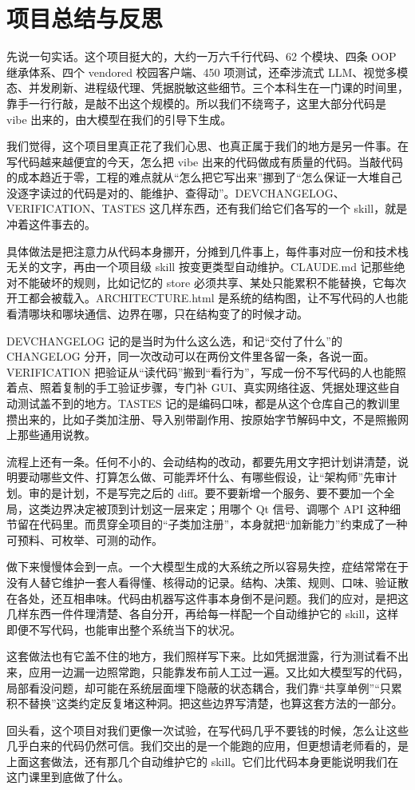 \documentclass[UTF8,a4paper,11pt,fontset=none]{ctexart}
\begin{document}
\section{项目总结与反思}

先说一句实话。这个项目挺大的，大约一万六千行代码、62 个模块、四条 OOP 继承体系、四个 vendored 校园客户端、450 项测试，还牵涉流式 LLM、视觉多模态、并发刷新、进程级代理、凭据脱敏这些细节。三个本科生在一门课的时间里，靠手一行行敲，是敲不出这个规模的。所以我们不绕弯子，这里大部分代码是 vibe 出来的，由大模型在我们的引导下生成。

我们觉得，这个项目里真正花了我们心思、也真正属于我们的地方是另一件事。在写代码越来越便宜的今天，怎么把 vibe 出来的代码做成有质量的代码。当敲代码的成本趋近于零，工程的难点就从“怎么把它写出来”挪到了“怎么保证一大堆自己没逐字读过的代码是对的、能维护、查得动”。DEVCHANGELOG、VERIFICATION、TASTES 这几样东西，还有我们给它们各写的一个 skill，就是冲着这件事去的。

具体做法是把注意力从代码本身挪开，分摊到几件事上，每件事对应一份和技术栈无关的文字，再由一个项目级 skill 按变更类型自动维护。CLAUDE.md 记那些绝对不能破坏的规则，比如记忆的 store 必须共享、某处只能累积不能替换，它每次开工都会被载入。ARCHITECTURE.html 是系统的结构图，让不写代码的人也能看清哪块和哪块通信、边界在哪，只在结构变了的时候才动。

DEVCHANGELOG 记的是当时为什么这么选，和记“交付了什么”的 CHANGELOG 分开，同一次改动可以在两份文件里各留一条，各说一面。VERIFICATION 把验证从“读代码”搬到“看行为”，写成一份不写代码的人也能照着点、照着复制的手工验证步骤，专门补 GUI、真实网络往返、凭据处理这些自动测试盖不到的地方。TASTES 记的是编码口味，都是从这个仓库自己的教训里攒出来的，比如子类加注册、导入别带副作用、按原始字节解码中文，不是照搬网上那些通用说教。

流程上还有一条。任何不小的、会动结构的改动，都要先用文字把计划讲清楚，说明要动哪些文件、打算怎么做、可能弄坏什么、有哪些假设，让“架构师”先审计划。审的是计划，不是写完之后的 diff。要不要新增一个服务、要不要加一个全局，这类边界决定被顶到计划这一层来定；用哪个 Qt 信号、调哪个 API 这种细节留在代码里。而贯穿全项目的“子类加注册”，本身就把“加新能力”约束成了一种可预料、可枚举、可测的动作。

做下来慢慢体会到一点。一个大模型生成的大系统之所以容易失控，症结常常在于没有人替它维护一套人看得懂、核得动的记录。结构、决策、规则、口味、验证散在各处，还互相串味。代码由机器写这件事本身倒不是问题。我们的应对，是把这几样东西一件件理清楚、各自分开，再给每一样配一个自动维护它的 skill，这样即便不写代码，也能审出整个系统当下的状况。

这套做法也有它盖不住的地方，我们照样写下来。比如凭据泄露，行为测试看不出来，应用一边漏一边照常跑，只能靠发布前人工过一遍。又比如大模型写的代码，局部看没问题，却可能在系统层面埋下隐蔽的状态耦合，我们靠“共享单例”“只累积不替换”这类约定反复堵这种洞。把这些边界写清楚，也算这套方法的一部分。

回头看，这个项目对我们更像一次试验，在写代码几乎不要钱的时候，怎么让这些几乎白来的代码仍然可信。我们交出的是一个能跑的应用，但更想请老师看的，是上面这套做法，还有那几个自动维护它的 skill。它们比代码本身更能说明我们在这门课里到底做了什么。
\end{document}
